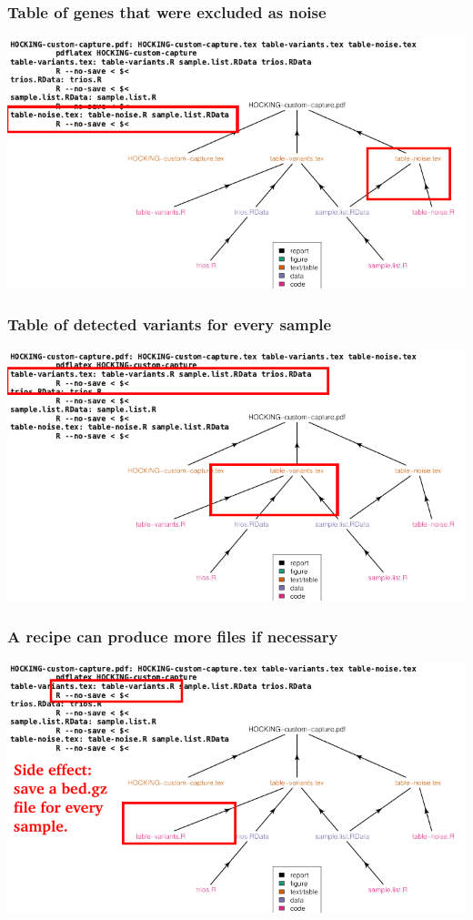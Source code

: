 \documentclass{beamer}
\begin{document}
\begin{frame}
  \frametitle{Table of genes that were excluded as noise}
\includegraphics[width=\textwidth]{figure-code-dag-line5}
\end{frame}

\begin{frame}
  \frametitle{Table of detected variants for every sample}
\includegraphics[width=\textwidth]{figure-code-dag-line2}
\end{frame}

\begin{frame}
  \frametitle{A recipe can produce more files if necessary}
\includegraphics[width=\textwidth]{figure-code-dag-line2-bed}
\end{frame}
\end{document}
